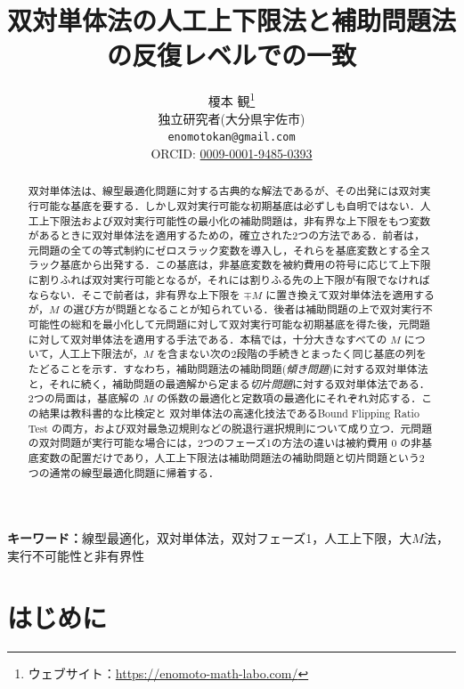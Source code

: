 \documentclass[11pt,a4paper]{ltjsarticle}
\title{双対単体法の人工上下限法と補助問題法の反復レベルでの一致}
\author{榎本 観\thanks{ウェブサイト：\url{https://enomoto-math-labo.com/}}\\
独立研究者(大分県宇佐市)\\
\texttt{enomotokan@gmail.com}\\
ORCID: \href{https://orcid.org/0009-0001-9485-0393}{0009-0001-9485-0393}}
\date{}
\theoremstyle{plain}
\theoremstyle{definition}
\theoremstyle{remark}
\begin{document}
\maketitle

\begin{abstract}
双対単体法は、線型最適化問題に対する古典的な解法であるが、その出発には双対実行可能な基底を要する．しかし双対実行可能な初期基底は必ずしも自明ではない．人工上下限法および双対実行可能性の最小化の補助問題は，非有界な上下限をもつ変数があるときに双対単体法を適用するための，確立された2つの方法である．前者は，元問題の全ての等式制約にゼロスラック変数を導入し，それらを基底変数とする全スラック基底から出発する．この基底は，非基底変数を被約費用の符号に応じて上下限に割りふれば双対実行可能となるが，それには割りふる先の上下限が有限でなければならない．そこで前者は，非有界な上下限を $\mp M$ に置き換えて双対単体法を適用するが，$M$ の選び方が問題となることが知られている．後者は補助問題の上で双対実行不可能性の総和を最小化して元問題に対して双対実行可能な初期基底を得た後，元問題に対して双対単体法を適用する手法である．本稿では，十分大きなすべての $M$ について，人工上下限法が，$M$ を含まない次の2段階の手続きとまったく同じ基底の列をたどることを示す．すなわち，補助問題法の補助問題(\emph{傾き問題})に対する双対単体法と，それに続く，補助問題の最適解から定まる\emph{切片問題}に対する双対単体法である．2つの局面は，基底解の $M$ の係数の最適化と定数項の最適化にそれぞれ対応する．この結果は教科書的な比検定と 双対単体法の高速化技法であるBound Flipping Ratio Test の両方，および双対最急辺規則などの脱退行選択規則について成り立つ．元問題の双対問題が実行可能な場合には，2つのフェーズ1の方法の違いは被約費用 $0$ の非基底変数の配置だけであり，人工上下限法は補助問題法の補助問題と切片問題という2つの通常の線型最適化問題に帰着する．
\end{abstract}

\noindent\textbf{キーワード：}線型最適化，双対単体法，双対フェーズ1，人工上下限，大$M$法，実行不可能性と非有界性

\section{はじめに}
\label{sec:intro}
\end{document}
